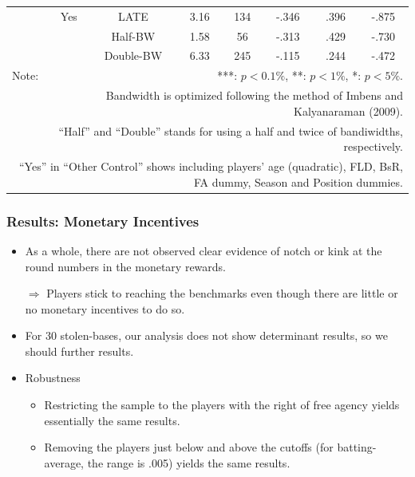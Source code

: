 \documentclass[dvipdfmx,12pt]{beamer}
\begin{document}
\begin{frame}
\begin{table}[!]
\begin{tabular}{lccccccc}
      & Yes & LATE & 3.16 & 134 & -.346 & .396 & -.875 \\
      & & Half-BW & 1.58 & 56 & -.313 & .429 & -.730 \\
      & & Double-BW & 6.33 & 245 & -.115 & .244 & -.472 \\ \hline

      Note: & \multicolumn{7}{r}{***: $p<0.1\%$, **: $p<1\%$, *: $p<5\%$.} \\
      & \multicolumn{7}{r}{Bandwidth is optimized following the method of Imbens and Kalyanaraman (2009).} \\
      & \multicolumn{7}{r}{``Half'' and ``Double'' stands for using a half and twice of bandiwidths, respectively.} \\
      \multicolumn{8}{r}{
      ``Yes'' in ``Other Control'' shows including players' age (quadratic), FLD, BsR, FA dummy, Season and Position dummies.
      }
    \end{tabular}
  \end{table}
\end{frame}

\begin{frame}
  
\end{frame}

\begin{frame}
  
\end{frame}


\begin{frame}\frametitle{Results: Monetary Incentives}
  \begin{itemize}
    \item As a whole, there are not observed clear evidence of notch or kink at the round numbers in the monetary rewards.

    $\Rightarrow$ Players stick to reaching the benchmarks even though there are little or no monetary incentives to do so.

    \item For 30 stolen-bases, our analysis does not show determinant results, so we should further results.

    \item Robustness

    \begin{itemize}
      \item Restricting the sample to the players with the right of free agency yields essentially the same results.

      \item Removing the players just below and above the cutoffs (for batting-average, the range is .005) yields the same results.
    \end{itemize}

  \end{itemize}
\end{frame}
\end{document}
